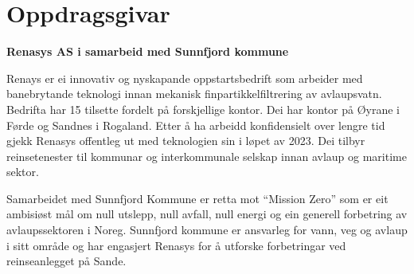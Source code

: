 \section{Oppdragsgivar}
\textbf{Renasys AS i samarbeid med Sunnfjord kommune}

Renays \citep{Renasys} er ei innovativ og nyskapande oppstartsbedrift som arbeider med banebrytande teknologi innan mekanisk finpartikkelfiltrering av avlaupsvatn.
Bedrifta har 15 tilsette fordelt på forskjellige kontor. Dei har kontor på Øyrane i Førde og Sandnes i Rogaland. 
Etter å ha arbeidd konfidensielt over lengre tid gjekk Renasys offentleg ut med teknologien sin i løpet av 2023. 
Dei tilbyr reinsetenester til kommunar og interkommunale selskap innan avlaup og maritime sektor.

Samarbeidet med \gls{Sunnfjord Kommune} \citep{SunnfjordKommune} er retta mot ``Mission Zero'' som er eit ambisiøst mål om 
null utslepp, null avfall, null energi og ein generell forbetring av avlaupssektoren i Noreg. \newline
Sunnfjord kommune er ansvarleg for vann, veg og avlaup i sitt område og har engasjert 
Renasys for å utforske forbetringar ved reinseanlegget på Sande.
\newline
\newline


